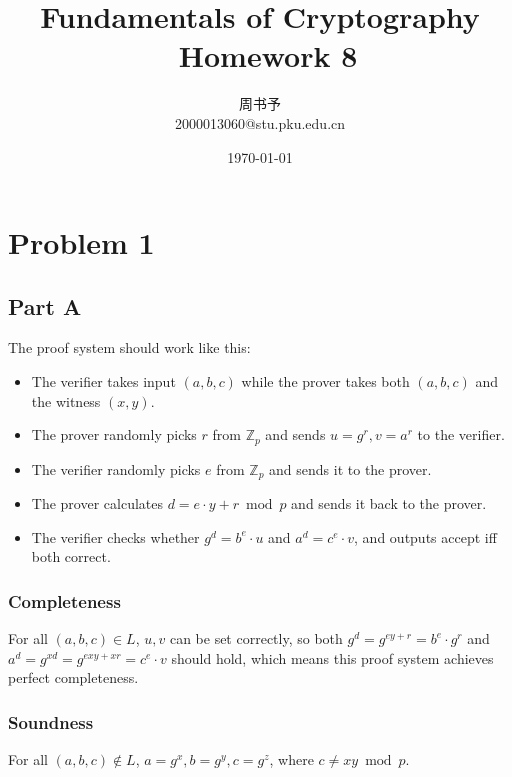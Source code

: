 \documentclass[8pt]{article}
\title{\heiti\zihao{1} Fundamentals  of Cryptography \ Homework 8}
\author{\kaishu\zihao{-3} 周书予\\2000013060@stu.pku.edu.cn}
\date{\today}
\theoremstyle{compact}
\def\Pr#1{\text{Pr}\left[{#1}\right]}
\def\Enc{\textsf{Enc}}
\def\Dec{\textsf{Dec}}
\def\Gen{\textsf{Gen}}
\begin{document}
\large
{}
\pagestyle{plain}



\maketitle

\def\Gen{\textsf{Gen}}
\def\Enc{\textsf{Enc}}
\def\Dec{\textsf{Dec}}
\def\Sign{\textsf{Sign}}
\def\Verify{\textsf{Verify}}
\def\Pr{\text{Pr}}
\def\poly{\text{poly}}

\def\Agg{\textsf{Aggregate}}

\section*{Problem 1}
\subsection*{Part A}
The proof system should work like this: \begin{itemize}
	\item The verifier takes input $(a, b, c)$ while the prover takes both $(a, b, c)$ and the witness $(x, y)$.
	\item The prover randomly picks $r$ from $\mathbb Z_p$ and sends $u = g^r, v = a^r$ to the verifier.
	\item The verifier randomly picks $e$ from $\mathbb Z_p$ and sends it to the prover.
	\item The prover calculates $d = e \cdot y + r \bmod p$ and sends it back to the prover.
	\item The verifier checks whether $g^d = b^e \cdot u$ and $a^d = c^e \cdot v$, and outputs \textsf{accept} iff both correct.
\end{itemize}

\subsubsection*{Completeness}
For all $(a, b, c) \in L$, $u, v$ can be set correctly, so both $g^d = g^{ey + r} = b^e \cdot g^r$ and $a^d = g^{xd} = g^{exy + xr} = c^e \cdot v$ should hold, which means this proof system achieves perfect completeness.

\subsubsection*{Soundness}
For all $(a, b, c) \notin L$, $a = g^x, b = g^y, c = g^z$, where $c \neq xy \bmod p$.
\end{document}
